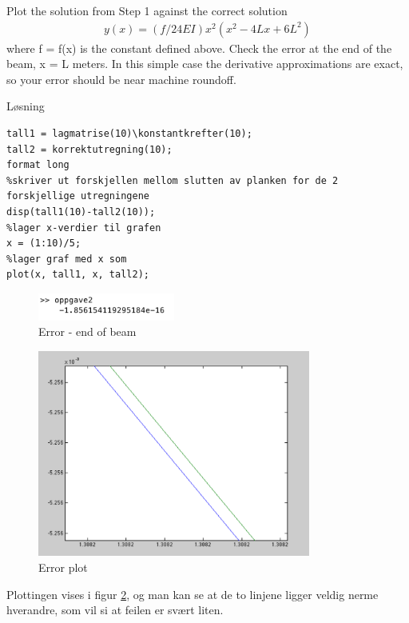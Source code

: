 % 

Plot the solution from Step 1 against the correct solution
\begin{align}
	y(x) = (f/24EI)x^2(x^2 − 4Lx + 6L^2)
\end{align}
where f = f(x) is the constant defined above.
\newline
\newline
Check the error at the end of the beam, x = L meters. In this simple case the derivative approximations are exact, so your error should be near machine roundoff.

\vspace{5mm}
Løsning

\begin{lstlisting}[caption={oppgave2.m}]
tall1 = lagmatrise(10)\konstantkrefter(10);
tall2 = korrektutregning(10);
format long
%skriver ut forskjellen mellom slutten av planken for de 2 forskjellige utregningene
disp(tall1(10)-tall2(10));
%lager x-verdier til grafen
x = (1:10)/5;
%lager graf med x som
plot(x, tall1, x, tall2); 
\end{lstlisting}

\vspace{3mm}

\begin{figure}[h]
    \centering
    \includegraphics[width=0.4\textwidth]{sections/Exercise2/disp2}
    \caption{Error - end of beam}
    \label{fig:disp2}
\end{figure}

\begin{figure}[h]
    \centering
    \includegraphics[width=0.8\textwidth]{sections/Exercise2/errorplot2}
    \caption{Error plot}
    \label{fig:errorplot2}
\end{figure}
 
Plottingen vises i figur \ref{fig:errorplot2}, og man kan se at de to linjene ligger veldig nerme hverandre, som vil si at feilen er svært liten.


% 